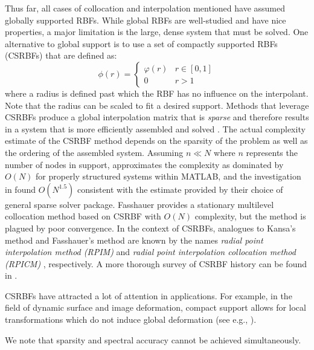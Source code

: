 \documentclass{report}
\begin{document}
{Thus far, all cases of collocation and interpolation mentioned have assumed globally supported RBFs. While global RBFs are well-studied and have nice properties, a major limitation is the large, dense system that must be solved. One alternative to global support is to use a set of compactly supported RBFs (CSRBFs) that are defined as: 
\begin{equation}
\phi(r) = \begin{cases} \varphi(r) & r \in [0,1]\\
0 & r > 1
\end{cases}
\label{eqn:csrbf}
\end{equation}
where a radius is defined past which the RBF has no influence on the interpolant. Note that the radius can be scaled to fit a desired support. Methods that leverage CSRBFs produce a global interpolation matrix that is \emph{sparse} and therefore results in a system that is more efficiently assembled and solved \cite{Fasshauer2007}. The actual complexity estimate of the CSRBF method depends on the sparsity of the problem as well as the ordering of the assembled system. Assuming $n \ll N$ where $n$ represents the number of nodes in support, \cite{Zhang2004} approximates the complexity as dominated by $O(N)$ for properly structured systems within MATLAB, and the investigation in \cite{Morse2005} found $O(N^{1.5})$ consistent with the estimate provided by their choice of general sparse solver package. Fasshauer \cite{Fasshauer2007} provides a stationary multilevel collocation method based on CSRBF with $O(N)$ complexity, but the method is plagued by poor convergence. In the context of CSRBFs, analogues to Kansa's method and Fasshauer's method are known by the names \emph{radial point interpolation method (RPIM)} \cite{Wang2002} and \emph{radial point interpolation collocation method (RPICM)} \cite{Liu2005}, respectively. A more thorough survey of CSRBF history can be found in \cite{Fasshauer2007,Iske2004}.

CSRBFs have attracted a lot of attention in applications. For example, in the field of dynamic surface and image deformation, compact support allows for local transformations which do not induce global deformation (see e.g., \cite{Yang2008, Lin2009, Correa2007}). 

We note that sparsity and spectral accuracy cannot be achieved simultaneously. 


}
\end{document}
